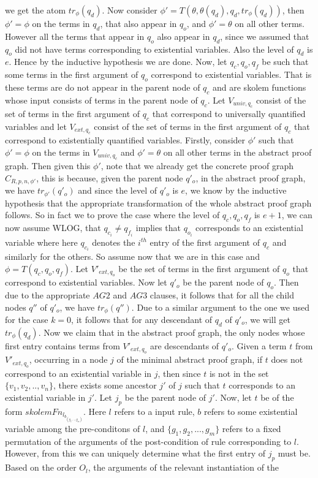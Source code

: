 \documentclass[sigconf]{acmart}
\begin{document}
we get the atom $tr_{\phi}(q_{d})$. Now consider $\phi'= T(\theta, \theta(q_{d}), q_{d}, tr_{\phi}(q_{d}))$, then $\phi'=\phi$ on the terms in $q_{d}$, that also appear in $q_{o}$, and $\phi' = \theta$ on all other terms. However all the terms that appear in $q_{o}$ also appear in $q_{d}$, since we assumed that $q_{o}$ did not have terms corresponding to existential variables. Also the level of $q_{d}$ is $e$. Hence by the inductive hypothesis we are done. Now, let $q_{c},q_{o},q_{f}$ be such that some terms in the first argument of $q_{o}$ correspond to existential variables. That is these terms are do not appear in the parent node of $q_{c}$ and are skolem functions whose input consists of terms in the parent node of $q_{c}$. Let $V_{univ,q_{c}}$ consist of the set of terms in the first argument of $q_{c}$ that correspond to universally quantified variables and let $V_{ext,q_{c}}$ consist of the set of terms in the first argument of $q_{c}$ that correspond to existentially quantified variables. Firstly, consider $\phi'$ such that $\phi'=\phi$ on the terms in $V_{univ,q_{c}}$ and $\phi' =\theta$ on all other terms in the abstract proof graph. Then given this $\phi'$, note that we already get the concrete proof graph $C_{R,p,n,\phi'}$, this is because, given the parent node $q'_{o}$, in the abstract proof graph, we have $tr_{\phi'}(q'_{o})$ and since the level of $q'_{o}$ is $e$, we know by the inductive hypothesis that the appropriate transformation of the whole abstract proof graph follows. So in fact we to prove the case where the level of $q_{c},q_{o},q_{f}$ is $e+1$, we can now assume WLOG, that $q_{c}_{i}\neq q_{f}_{i}$ implies that $q_{o}_{i}$ corresponds to an existential variable where here $q_{c}_{i}$ denotes the $i^{th}$ entry of the first argument of $q_{c}$ and similarly for the others. So assume now that we are in this case and $\phi= T(q_{c},q_{o},q_{f})$. Let $V'_{ext,q_{o}}$ be the set of terms in the first argument of $q_{o}$ that correspond to existential variables. Now let $q'_{o}$ be the parent node of $q_{o}$. Then due to the appropriate $AG2$ and $AG3$ clauses, it follows that for all the child nodes $q''$ of $q'_{o}$, we have $tr_{\phi}(q'')$. Due to a similar argument to the one we used for the case $k=0$, it follows that for any descendant of $q_{d}$ of $q'_{o}$, we will get $tr_{\phi}(q_{d})$. Now we claim that in the abstract proof graph, the only nodes whose first entry contains terms from $V'_{ext,q_{o}}$ are descendants of $q'_{o}$. Given a term $t$ from $V'_{ext,q_{o}}$, occurring in a node $j$ of the minimal abstract proof graph, if $t$ does not correspond to an existential variable in $j$, then since $t$ is not in the set $\{v_{1},v_{2},..,v_{n}\}$, there exists some ancestor $j'$ of $j$ such that $t$ corresponds to an existential variable in $j'$. Let $j_{p}$ be the parent node of $j'$. Now, let $t$ be of the form $skolemFn_l_b_(g_{1},..,g_{m})$. Here $l$ refers to a input rule, $b$ refers to some existential variable among the pre-conditons of $l$, and $\{g_{1},g_{2},...,g_{m}\}$ refers to a fixed permutation of the arguments of the post-condition of rule corresponding to $l$. However, from this we can uniquely determine what the first entry of $j_{p}$ must be. Based on the order $O_{l}$, the arguments of the relevant instantiation of the  
\end{document}
